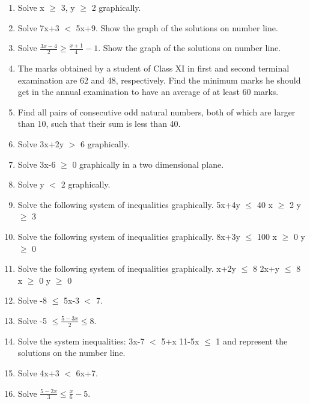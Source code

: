 \renewcommand{\theequation}{\theenumi}
\begin{enumerate}[label=\arabic*.,ref=\thesubsection.\theenumi]

\item Solve  x $\geq$ 3, y $\geq$ 2 graphically.
\\
\solution 


    \item Solve 7x+3 $<$ 5x+9. Show the graph of the solutions on number line.
    \item Solve $\frac{3x-4}{2} \geq \frac{x+1}{4}-1$. Show the graph of the solutions on number line.
\\
\solution 

    \item The marks obtained by a student of Class XI in first and second terminal examination are 62 and 48, respectively. Find the minimum marks he should get in the annual examination to have an average of at least 60 marks.
    \item Find all pairs of consecutive odd natural numbers, both of which are larger than 10, such that their sum is less than 40.
    \item Solve 3x+2y $>$ 6 graphically.
    \item Solve 3x-6 $\geq$ 0 graphically in a two dimensional plane.
    \item Solve y $<$ 2 graphically.
    \item Solve the following system of inequalities graphically.
     5x+4y $\leq$ 40
     x $\geq$ 2
     y $\geq$ 3
     \item Solve the following system of inequalities graphically.
     8x+3y $\leq$ 100
     x $\geq$ 0
     y $\geq$ 0
     \item Solve the following system of inequalities graphically.
     x+2y $\leq$ 8
     2x+y $\leq$ 8
     x $\geq$ 0
     y $\geq$ 0
     \item Solve -8 $\leq$ 5x-3 $<$ 7.
     \item Solve -5 $\leq \frac{5-3x}{2} \leq 8$.
     \item Solve the system inequalities:
     3x-7 $<$ 5+x
     11-5x $\leq$ 1
     and represent the solutions on the number line.
    
    \item Solve 4x+3 $<$ 6x+7.
    \item Solve $\frac{5-2x}{3} \leq \frac{x}{6}-5$.


\end{enumerate}
